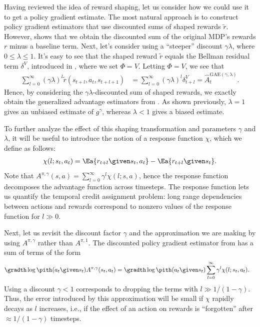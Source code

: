 \documentclass{article}
\renewcommand{\bg}{g}
\newcommand{\dv}{\delta^V}
\newcommand{\hatalam}{\hat{A}^{\mathrm{GAE(\gamma,\lambda)}}}
\newcommand{\delay}{l}
\newcommand{\bgrad}{\bg^{\gamma}}
\newcommand{\Apigam}{A^{\pi,\gamma}}
\newcommand{\tilr}{\tilde{r}}
\newcommand{\resp}{\chi}
\begin{document}
Having reviewed the idea of reward shaping, let us consider how we could use it to get a policy gradient estimate.
The most natural approach is to construct policy gradient estimators that use discounted sums of shaped rewards $\tilr$.
However,  shows that we obtain the discounted sum of the original MDP's rewards $r$ minus a baseline term.
Next, let's consider using a ``steeper'' discount $\gamma \lambda$, where $0 \le \lambda \le 1$.
It's easy to see that the shaped reward $\tilr$ equals the Bellman residual term $\dv$, introduced in , where we set $\Phi=V$.
Letting $\Phi=V$, we see that
\begin{align}
\sum_{\delay=0}^{\infty} (\gamma \lambda)^{\delay}\tilr(s_{t+\delay},a_t,s_{t+\delay+1}) &= \sum_{\delay=0}^{\infty} (\gamma \lambda)^{\delay} \dv_{t+\delay}
= \hatalam_t.
\end{align}
Hence, by considering the $\gamma\lambda$-discounted sum of shaped rewards, we exactly obtain the generalized advantage estimators from .
As shown previously, $\lambda=1$ gives an unbiased estimate of $\bgrad$, whereas $\lambda<1$ gives a biased estimate.



To further analyze the effect of this shaping transformation and parameters $\gamma$ and $\lambda$, it will be useful to introduce the notion of a response function $\resp$, which we define as follows:
\begin{align}
\resp(\delay; s_t, a_t) = \Ea{r_{t+\delay} \given s_t, a_t}  - \Ea{r_{t+\delay} \given s_t}.
\end{align}
Note that $A^{\pi,\gamma}(s,a) = \sum_{\delay=0}^{\infty} \gamma^{\delay} \resp(\delay; s, a)$, hence the response function decomposes the advantage function across timesteps.
The response function lets us quantify the temporal credit assignment problem: long range dependencies between actions and rewards correspond to nonzero values of the response function for $\delay \gg 0$.

Next, let us revisit the discount factor $\gamma$ and the approximation we are making by using $\Apigam$ rather than $A^{\pi,1}$.
The discounted policy gradient estimator from  has a sum of terms of the form
\begin{align}
\gradth \log \pith(a_t \given s_t) A^{\pi,\gamma}(s_t, a_t)
&= \gradth \log \pith(a_t \given s_t) \sum_{\delay=0}^{\infty} \gamma^{\delay} \chi(\delay; s_t,a_t) .
\end{align}
Using a discount $\gamma < 1$ corresponds to dropping the terms with $\delay \gg 1/(1-\gamma)$.
Thus, the error introduced by this approximation will be small if $\resp$ rapidly decays as $\delay$ increases, i.e., if the effect of an action on rewards is ``forgotten'' after $\approx 1/(1-\gamma)$ timesteps.
\end{document}
